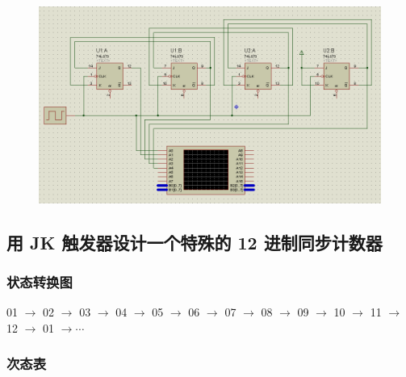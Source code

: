 \documentclass{article}
\begin{document}
\begin{figure}[!hbp]
  \centering
  \includegraphics[scale=0.35]{3/1.png}
\end{figure}

\newpage

\subsection{用 JK 触发器设计一个特殊的 12 进制同步计数器}

\subsubsection{状态转换图}

01 $\rightarrow$ 02 $\rightarrow$ 03 $\rightarrow$ 04 $\rightarrow$ 05 $\rightarrow$ 06 $\rightarrow$ 07 $\rightarrow$ 08 $\rightarrow$ 09 $\rightarrow$ 10 $\rightarrow$ 11 $\rightarrow$ 12 $\rightarrow$ 01 $\rightarrow \cdots$

\subsubsection{次态表}
\end{document}
